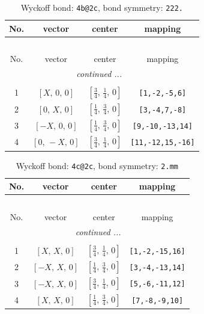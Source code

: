 \documentclass[fleqn,8pt]{jsarticle}
\begin{document}
\begin{longtable}{cccc}
\caption{Wyckoff bond: {\tt 4b@2c}, bond symmetry: {\tt 222.}}
 \\
 \hline \hline
No. & vector & center & mapping \\ \hline \endfirsthead

\multicolumn{3}{l}{\tablename\ \thetable{}} \\
 \hline \hline
No. & vector & center & mapping \\ \hline \endhead

 \hline \hline
\multicolumn{3}{r}{\footnotesize\it continued ...} \\ \endfoot

 \hline \hline
\multicolumn{3}{r}{} \\ \endlastfoot

1 & $\left[ X,\, 0,\, 0 \right]$ & $\left[ \frac{3}{4},\, \frac{1}{4},\, 0 \right]$ & {\tt [1,-2,-5,6]} \\ \hline
2 & $\left[ 0,\, X,\, 0 \right]$ & $\left[ \frac{1}{4},\, \frac{3}{4},\, 0 \right]$ & {\tt [3,-4,7,-8]} \\ \hline
3 & $\left[ - X,\, 0,\, 0 \right]$ & $\left[ \frac{1}{4},\, \frac{3}{4},\, 0 \right]$ & {\tt [9,-10,-13,14]} \\ \hline
4 & $\left[ 0,\, - X,\, 0 \right]$ & $\left[ \frac{3}{4},\, \frac{1}{4},\, 0 \right]$ & {\tt [11,-12,15,-16]} \\
\end{longtable}
\renewcommand{\arraystretch}{1.2}
\begin{longtable}{cccc}
\caption{Wyckoff bond: {\tt 4c@2c}, bond symmetry: {\tt 2.mm}}
 \\
 \hline \hline
No. & vector & center & mapping \\ \hline \endfirsthead

\multicolumn{3}{l}{\tablename\ \thetable{}} \\
 \hline \hline
No. & vector & center & mapping \\ \hline \endhead

 \hline \hline
\multicolumn{3}{r}{\footnotesize\it continued ...} \\ \endfoot

 \hline \hline
\multicolumn{3}{r}{} \\ \endlastfoot

1 & $\left[ X,\, X,\, 0 \right]$ & $\left[ \frac{3}{4},\, \frac{1}{4},\, 0 \right]$ & {\tt [1,-2,-15,16]} \\ \hline
2 & $\left[ - X,\, X,\, 0 \right]$ & $\left[ \frac{1}{4},\, \frac{3}{4},\, 0 \right]$ & {\tt [3,-4,-13,14]} \\ \hline
3 & $\left[ - X,\, X,\, 0 \right]$ & $\left[ \frac{3}{4},\, \frac{1}{4},\, 0 \right]$ & {\tt [5,-6,-11,12]} \\ \hline
4 & $\left[ X,\, X,\, 0 \right]$ & $\left[ \frac{1}{4},\, \frac{3}{4},\, 0 \right]$ & {\tt [7,-8,-9,10]} \\
\end{longtable}
\end{document}
